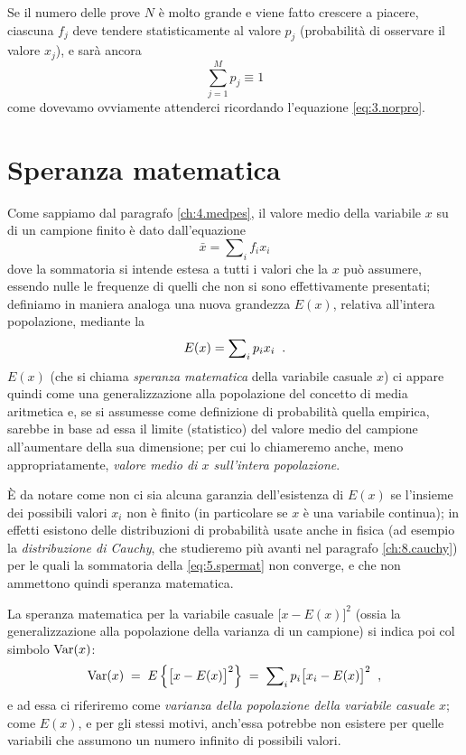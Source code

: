 Se il numero delle prove $N$ \`e molto grande e viene fatto
crescere a piacere, ciascuna $f_j$ deve tendere
statisticamente al valore $p_j$ (probabilit\`a di osservare
il valore $x_j$), e sar\`a ancora
\begin{equation*}
  \sum_{j=1}^{M} p_{j} \equiv 1
\end{equation*}
come dovevamo ovviamente attenderci ricordando l'equazione
\eqref{eq:3.norpro}.

\section{Speranza matematica}%
%
\label{ch:5.medcl}
Come sappiamo dal paragrafo \ref{ch:4.medpes}, il valore
medio della variabile $x$ su di un campione finito \`e dato
dall'equazione
\begin{equation*}
  \bar x = \sum\nolimits_i f_i x_i
\end{equation*}
dove la sommatoria si intende estesa a tutti i valori che la
$x$ pu\`o assumere, essendo nulle le frequenze di quelli che
non si sono effettivamente presentati; definiamo in maniera
analoga una nuova grandezza $E(x)$, relativa all'intera
popolazione, mediante la
\begin{equation} \label{eq:5.spermat}
  E(x) = \sum\nolimits_i p_i x_i \;\; .
\end{equation}
$E(x)$ (che si chiama \emph{speranza matematica} della
variabile casuale $x$) ci appare quindi come una
generalizzazione alla popolazione del concetto di media
aritmetica e, se si assumesse come definizione di
probabilit\`a quella empirica, sarebbe in base ad essa il
limite (statistico) del valore medio del campione
all'aumentare della sua dimensione; per cui lo chiameremo
anche, meno appropriatamente, \emph{valore medio di $x$
  sull'intera popolazione}.

\`E da notare come non ci sia alcuna garanzia dell'esistenza
di $E(x)$ se l'insieme dei possibili valori $x_i$ non \`e
finito (in particolare se $x$ \`e una variabile continua);
in effetti esistono delle distribuzioni di probabilit\`a
usate anche in fisica (ad esempio la \emph{distribuzione di
  Cauchy},%
 che studieremo pi\`u avanti
nel paragrafo \ref{ch:8.cauchy}) per le quali la sommatoria
della \eqref{eq:5.spermat} non converge, e che non ammettono
quindi speranza matematica.%

%
La speranza matematica per la variabile casuale $\bigl[ x -
E(x) \bigr]^2$ (ossia la generalizzazione alla popolazione
della varianza di un campione) si indica poi col simbolo
$\operatorname{Var}(x)$:
\begin{equation*}
  \operatorname{Var}(x) \; = \; E \left\{ \bigl[ x - E(x) \bigr]^2
    \right\} \; = \; \sum\nolimits_i p_i \bigl[ x_i -
    E(x) \bigr]^2 \;\; ,
\end{equation*}
e ad essa ci riferiremo come \emph{varianza della
  popolazione della variabile casuale} $x$; come $E(x)$, e
per gli stessi motivi, anch'essa potrebbe non esistere per
quelle variabili che assumono un numero infinito di
possibili valori.%

